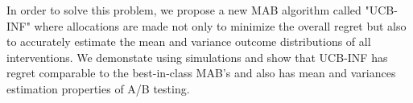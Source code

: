\documentclass[12pt, letterpaper]{article}
\begin{document}
In order to solve this problem, we propose a new MAB algorithm called "UCB-INF" where allocations are made not only to minimize the overall regret but also to accurately estimate the mean and variance outcome distributions of all interventions. We demonstate using simulations and show that UCB-INF has regret comparable to the best-in-class MAB's and also has mean and variances estimation properties of A/B testing.

\end{document}
